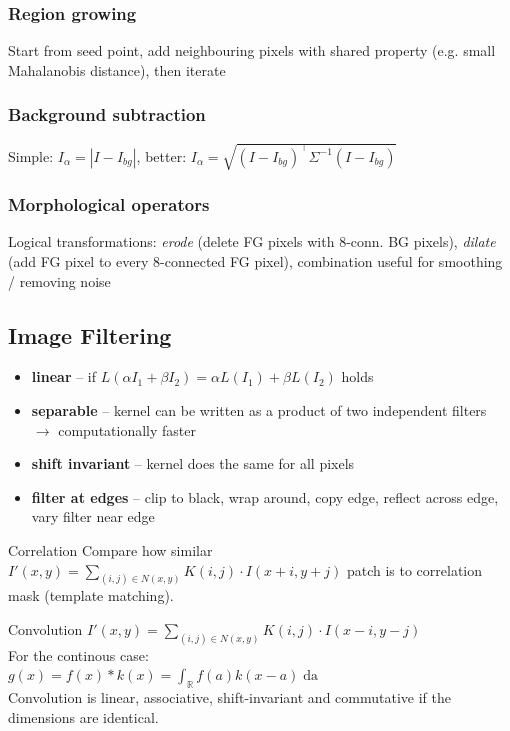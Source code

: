 \documentclass[a4paper,10pt]{article}
\begin{document}
\subsubsection{Region growing}
Start from seed point, add neighbouring pixels with shared property (e.g. small Mahalanobis distance), then iterate

\subsubsection{Background subtraction}
Simple: \( I_\alpha = \left| I - I_{bg} \right| \), better: \( I_\alpha = \sqrt{(I-I_{bg})^\top \Sigma^{-1} (I-I_{bg})}  \)

\subsubsection{Morphological operators} 
Logical transformations: \textit{erode} (delete FG pixels with 8-conn. BG pixels), \textit{dilate} (add FG pixel to every 8-connected FG pixel), combination useful for smoothing / removing noise

\subsection{Image Filtering}
\begin{itemize}
    \item \textbf{linear} -- if \( L(\alpha I_{1} + \beta I_{2}) = \alpha L(I_{1}) + \beta L(I_{2}) \) holds
    \item \textbf{separable} -- kernel can be written as a product of two independent filters \( \to  \) computationally faster
    \item \textbf{shift invariant} -- kernel does the same for all pixels
    \item \textbf{filter at edges} -- clip to black, wrap around, copy edge, reflect across edge, vary filter near edge
\end{itemize}
\begin{mainbox}{Correlation}
    Compare how similar \( I'(x,y) = \sum_{(i,j) \in N(x,y)} K(i,j) \cdot I(x+i,y+j) \) patch is to correlation mask (template matching).
\end{mainbox}

\begin{mainbox}{Convolution}
    \( I'(x,y) = \sum_{(i,j) \in N(x,y)} K(i,j) \cdot I(x-i, y-j) \)\\
    For the continous case:\\\( g(x) = f(x) * k(x) = \int_\mathbb{R} f(a) k(x-a) \mathop{da}  \)\\
    Convolution is linear, associative, shift-invariant and commutative if the dimensions are identical.
\end{mainbox}
\end{document}
